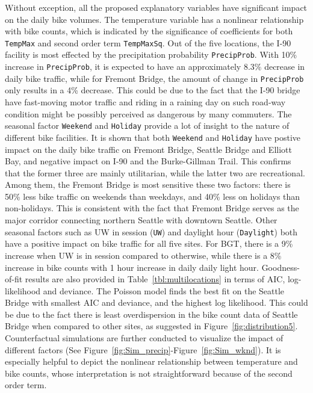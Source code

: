 \documentclass [11pt, proquest] {uwthesis}[2015/03/03]
\begin{document}
Without exception, all the proposed explanatory variables have significant impact on the daily bike volumes. The temperature variable has a nonlinear relationship with bike counts, which is indicated by the significance of coefficients for both \texttt{TempMax} and second order term \texttt{TempMaxSq}. Out of the five locations, the I-90 facility is most effected by the precipitation probability \texttt{PrecipProb}. With 10\% increase in \texttt{PrecipProb}, it is expected to have an approximately 8.3\% decrease in daily bike traffic, while for Fremont Bridge, the amount of change in \texttt{PrecipProb} only results in a 4\% decrease. This could be due to the fact that the I-90 bridge have fast-moving motor traffic and riding in a raining day on such road-way condition might be possibly perceived as dangerous by many commuters. The seasonal factor \texttt{Weekend} and \texttt{Holiday} provide a lot of insight to the nature of different bike facilities. It is shown that both \texttt{Weekend} and \texttt{Holiday} have postive impact on the daily bike traffic on Fremont Bridge, Seattle Bridge and Elliott Bay, and negative impact on I-90 and the Burke-Gillman Trail. This confirms that the former three are mainly utilitarian, while the latter two are recreational. Among them, the Fremont Bridge is most sensitive these two factors: there is 50\% less bike traffic on weekends than weekdays, and 40\% less on holidays than non-holidays. This is consistent with the fact that Fremont Bridge serves as the major corridor connecting northern Seattle with downtown Seattle. Other seasonal factors such as UW in session (\texttt{UW}) and daylight hour (\texttt{Daylight}) both have a positive impact on bike traffic for all five sites. For BGT, there is a 9\% increase when UW is in session compared to otherwise, while there is a 8\% increase in bike counts with 1 hour increase in daily daily light hour. Goodness-of-fit results are also provided in Table~\ref{tbl:multilocations} in terms of AIC, log-likelihood and deviance. The Poisson model finds the best fit on the Seattle Bridge with smallest AIC and deviance, and the highest log likelihood. This could be due to the fact there is least overdispersion in the bike count data of Seattle Bridge when compared to other sites, as suggested in Figure~\ref{fig:distribution5}. Counterfactual simulations are further conducted to visualize the impact of different factors (See Figure~\ref{fig:Sim_precip}-Figure~\ref{fig:Sim_wknd}). It is especially helpful to depict the nonlinear relationship between temperature and bike counts, whose interpretation is not straightforward because of the second order term. 
\end{document}
